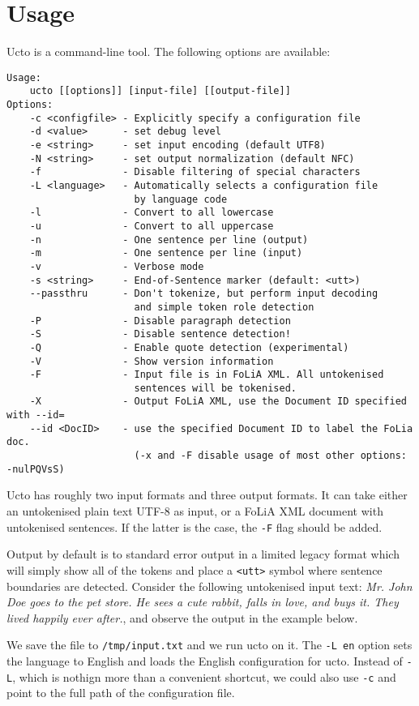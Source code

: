 \documentclass[a4paper,12pt]{report}
\begin{document}
\chapter{Usage}

Ucto is a command-line tool. The following options are available:

\begin{verbatim}
Usage: 
	ucto [[options]] [input-file] [[output-file]]
Options:
	-c <configfile> - Explicitly specify a configuration file
	-d <value>      - set debug level
	-e <string>     - set input encoding (default UTF8)
	-N <string>     - set output normalization (default NFC)
	-f              - Disable filtering of special characters
	-L <language>   - Automatically selects a configuration file 
	                  by language code
	-l              - Convert to all lowercase
	-u              - Convert to all uppercase
	-n              - One sentence per line (output)
	-m              - One sentence per line (input)
	-v              - Verbose mode
	-s <string>     - End-of-Sentence marker (default: <utt>)
	--passthru      - Don't tokenize, but perform input decoding 
	                  and simple token role detection
	-P              - Disable paragraph detection
	-S              - Disable sentence detection!
	-Q              - Enable quote detection (experimental)
	-V              - Show version information
	-F              - Input file is in FoLiA XML. All untokenised 
	                  sentences will be tokenised.
	-X              - Output FoLiA XML, use the Document ID specified with --id=
	--id <DocID>    - use the specified Document ID to label the FoLia doc.
	                  (-x and -F disable usage of most other options: -nulPQVsS)
\end{verbatim}


Ucto has roughly two input formats and three output formats. It can take either an untokenised plain text UTF-8 as input, or a FoLiA XML document with untokenised sentences. If the latter is the case, the \texttt{-F} flag should be added. 

Output by default is to standard error output in a limited legacy format which will simply show all of the tokens and place a \texttt{<utt>} symbol where sentence boundaries are detected. Consider the following untokenised input text: \emph{Mr. John Doe goes to the pet store. He sees a cute rabbit, falls in love, and buys it. They lived happily ever after.}, and observe the output in the example below.

We save the file to \texttt{/tmp/input.txt} and we run ucto on it. The \texttt{-L en} option sets the language to English and loads the English configuration for ucto. Instead of \texttt{-L}, which is nothign more than a convenient shortcut, we could also use \texttt{-c} and point to the full path of the configuration file.
\end{document}
